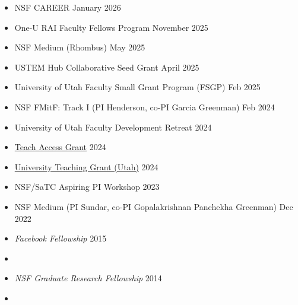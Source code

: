 \documentclass{article}
\begin{document}
\begin{itemize}
  \item NSF CAREER \hfill \hfill January 2026
  \item One-U RAI Faculty Fellows Program \hfill November 2025
  \item NSF Medium (Rhombus) \hfill May 2025
  \item USTEM Hub Collaborative Seed Grant \hfill April 2025
  \item University of Utah Faculty Small Grant Program (FSGP) \hfill Feb 2025
  \item NSF FMitF: Track I (PI Henderson, co-PI Garcia Greenman) \hfill Feb 2024
  \item University of Utah Faculty Development Retreat \hfill 2024
  \item \href{https://teachaccess.org/initiatives/grants/}{Teach Access Grant}  \hfill 2024
  \item \href{https://academic-affairs.utah.edu/awards-nominations/university-teaching-committee/university-teaching-grants/}{University Teaching Grant (Utah)} \hfill 2024
\item NSF/SaTC Aspiring PI Workshop \hfill 2023
\item NSF Medium (PI Sundar, co-PI Gopalakrishnan Panchekha Greenman) \hfill Dec 2022
\item \emph{Facebook Fellowship} \hfill 2015
\item[] [\href{http://cs.utah.edu/~blg/cv/failures/facebook-2015-reject.pdf}{application}]
\item \emph{NSF Graduate Research Fellowship} \hfill 2014
\item[] [\href{https://cs.utah.edu/~blg/cv/failures/nsf-2014-personal-reject.pdf}{personal statement}]
        [\href{https://cs.utah.edu/~blg/cv/failures/nsf-2014-research-reject.pdf}{research statement}]
        [\href{https://cs.utah.edu/~blg/cv/failures/nsf-2014-reject-response.pdf}{feedback}]
\end{itemize}


\end{document}
